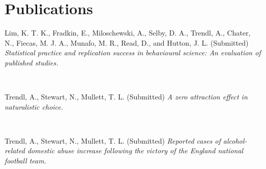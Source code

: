 \documentclass[11pt,a4paper,sans]{moderncv} %
\begin{document}

\section{Publications}
 

Lim, K. T. K., Fradkin, E., Miloschewski, A., Selby, D. A., Trendl, A., Chater, N., Fiecas, M. J. A., Munafo, M. R., Read, D., and Hutton, J. L. (Submitted) \textit{Statistical practice and replication success in behavioural science: An evaluation of published studies.}

\

Trendl, A., Stewart, N., Mullett, T. L. (Submitted) \textit{A zero attraction effect in naturalistic choice.}

\

Trendl, A., Stewart, N., Mullett, T. L. (Submitted) \textit{Reported cases of alcohol-related domestic abuse increase following the victory of the England national football team.}

\end{document}
